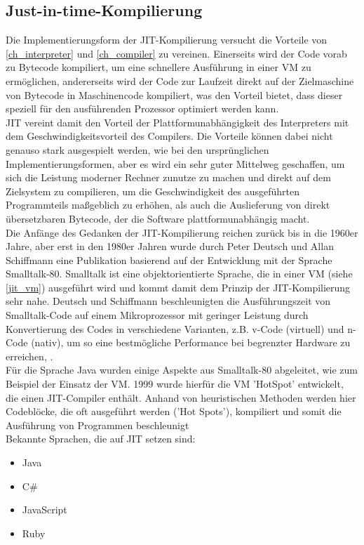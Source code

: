 \subsection{Just-in-time-Kompilierung} \label{ch_jit}
Die Implementierungsform der \ac{JIT}-Kompilierung versucht die Vorteile von \autoref{ch_interpreter} und \autoref{ch_compiler} zu vereinen. Einerseits wird der Code vorab zu Bytecode kompiliert, um eine schnellere Ausführung in einer \ac{VM} zu ermöglichen, andererseits wird der Code zur Laufzeit direkt auf der Zielmaschine von Bytecode in Maschinencode kompiliert, was den Vorteil bietet, dass dieser speziell für den ausführenden Prozessor optimiert werden kann.\\
\ac{JIT} vereint damit den Vorteil der Plattformunabhängigkeit des Interpreters mit dem Geschwindigkeitsvorteil des Compilers. Die Vorteile können dabei nicht genauso stark ausgespielt werden, wie bei den ursprünglichen Implementierungsformen, aber es wird ein sehr guter Mittelweg geschaffen, um sich die Leistung moderner Rechner zunutze zu machen und direkt auf dem Zielsystem zu compilieren, um die Geschwindigkeit des ausgeführten Programmteils maßgeblich zu erhöhen, als auch die Auslieferung von direkt übersetzbaren Bytecode, der die Software plattformunabhängig macht.\\
Die Anfänge des Gedanken der \ac{JIT}-Kompilierung reichen zurück bis in die 1960er Jahre, aber erst in den 1980er Jahren wurde durch Peter Deutsch und Allan Schiffmann eine Publikation basierend auf der Entwicklung mit der Sprache Smalltalk-80. Smalltalk ist eine objektorientierte Sprache, die in einer \ac{VM} (siehe \autoref{jit_vm}) ausgeführt wird und kommt damit dem Prinzip der \ac{JIT}-Kompilierung sehr nahe. Deutsch und Schiffmann beschleunigten die Ausführungszeit von Smalltalk-Code auf einem Mikroprozessor mit geringer Leistung durch Konvertierung des Codes in verschiedene Varianten, z.B. v-Code (virtuell) und n-Code (nativ), um so eine bestmögliche Performance bei begrenzter Hardware zu erreichen, \cite[vgl. Deutsch und Schiffmann 1984, S.1ff]{Deutsch_Schiffmann1984}.\\
Für die Sprache Java wurden einige Aspekte aus Smalltalk-80 abgeleitet, wie zum Beispiel der Einsatz der \ac{VM}. 1999 wurde hierfür die \ac{VM} 'HotSpot' entwickelt, die einen \ac{JIT}-Compiler enthält. Anhand von heuristischen Methoden werden hier Codeblöcke, die oft ausgeführt werden ('Hot Spots'), kompiliert und somit die Ausführung von Programmen beschleunigt \cite[vgl. Kotzmann und Wimmer 2008, S.2ff]{KotzmannWimmer2008}\\
Bekannte Sprachen, die auf \ac{JIT} setzen sind: 
\begin{itemize}
    \item Java
    \item C\#
    \item JavaScript
    \item Ruby
\end{itemize}

